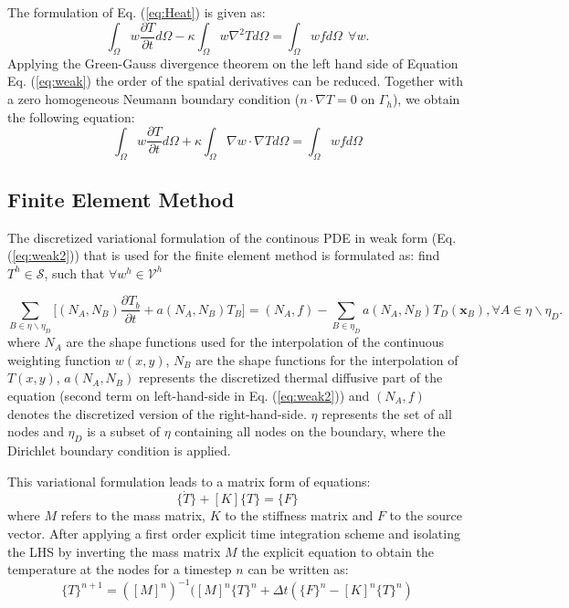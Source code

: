\documentclass[a4paper, 11pt, oneside]{scrartcl}
\newcommand{\pp}[2]{\frac{\partial #1}{\partial #2}}%
\newcommand{\vect}[1]{\boldsymbol{\mathbf{#1}}}
\newcommand{\refEq}[1]{Eq. (\ref{#1})}
\begin{document}
The formulation of \refEq{eq:Heat} is given as:
\begin{equation}
	\label{eq:weak}
	\int_{\Omega} w\pp{T}{t} d\Omega - \kappa \int_{\Omega} w \nabla^2 T d\Omega = \int_{\Omega}w f d\Omega \ \ \forall w .
\end{equation}
Applying the Green-Gauss divergence theorem on the left hand side of Equation \refEq{eq:weak} the order of the spatial derivatives can be reduced. Together with a zero homogeneous Neumann boundary condition ($n \cdot \nabla T = 0 \text{ on } \Gamma_h$), we obtain the following equation:
\begin{equation}
	\label{eq:weak2}
	\int_{\Omega}w\pp{T}{t} d\Omega + \kappa \int_{\Omega} \nabla w \cdot \nabla T d\Omega = \int_{\Omega} w f d\Omega
\end{equation}

\subsection{Finite Element Method}

The discretized variational formulation of the continous PDE in weak form (\refEq{eq:weak2})  that is used for the finite element method is formulated as: find $T^h \in \mathcal{S}$, such that $\forall w^h \in \mathcal{V}^h$

\begin{equation}
	\sum_{B \in \eta \backslash \eta_D} \Bigg[(N_A,N_B) \pp{T_b}{t} + a(N_A,N_B)T_B \Bigg] = (N_A,f) - \sum_{B \in \eta_D} a(N_A,N_B)T_D(\vect{x}_B), \forall A \in \eta \backslash \eta_D .
\end{equation}
where $N_A$ are the shape functions used for the interpolation of the continuous weighting function $w(x,y)$, $N_B$ are the shape functions for the interpolation of $T(x,y)$, $a(N_A, N_B)$ represents the discretized thermal diffusive part of the equation (second term on left-hand-side in \refEq{eq:weak2}) and $(N_A,f)$ denotes the discretized version of the right-hand-side. $\eta$ represents the set of all nodes and $\eta_D$ is a subset of $\eta$ containing all nodes on the boundary, where the Dirichlet boundary condition is applied.

This variational formulation leads to a matrix form of equations:
\begin{equation}
	[M] \Big\{ \dot{T} \Big\} + [K] \Big\{ T \Big\} = \Big\{ F \Big\} 
\end{equation}
where $M$ refers to the mass matrix, $K$ to the stiffness matrix and $F$ to the source vector. After applying a first order explicit time integration scheme and isolating the LHS by inverting the mass matrix $M$ the explicit equation to obtain the temperature at the nodes for a timestep $n$ can be written as:
\begin{equation}
	\{T\}^{n+1} = ([M]^n)^{-1}([M]^n\{T\}^n + \Delta t(\{F\}^n-[K]^n\{T\}^n)
\end{equation}
\end{document}
